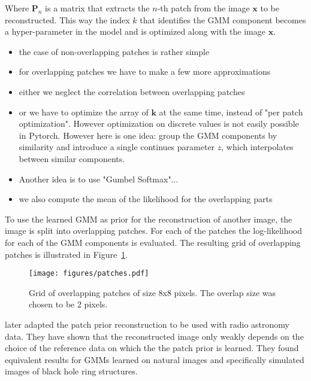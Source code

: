 \documentclass[twocolumn]{aastex631}
\begin{document}
    Where $\mathbf{P}_n$ is a matrix that extracts the $n$-th patch
    from the image $\mathbf{x}$ to be reconstructed. This way the index $k$ that identifies the GMM component becomes a hyper-parameter in the model and is optimized along with the image $\mathbf{x}$.
    
    \begin{itemize}
        \item the case of non-overlapping patches is rather simple
        \item for overlapping patches we have to make a few more approximations
        \item either we neglect the correlation between overlapping patches
        \item or we have to optimize the array of $\mathbf{k}$ at the same time, instead of "per patch optimization". However optimization on discrete 
        values is not easily possible in Pytorch. However here is one idea:
        group the GMM components by similarity and introduce a single continues
        parameter $z$, which interpolates between similar components.
        \item Another idea is to use "Gumbel Softmax"...
        \item we also compute the mean of the likelihood for the overlapping parts
    \end{itemize}

    To use the learned GMM as prior for the reconstruction of another image, the image is split into overlapping patches. For each of the patches the log-likelihood for each of the GMM components is evaluated. The resulting grid of overlapping patches is illustrated in Figure~\ref{fig:patches}.

    \begin{figure}
        \begin{centering}
            \texttt{[image: figures/patches.pdf]}
            \caption{
                Grid of overlapping patches of size 8x8 pixels. The overlap size was chosen to be 2 pixels.
            }
            \label{fig:patches}
        \end{centering}
    \end{figure}

    \cite{Bouman2016} later adapted the patch prior reconstruction to be used
    with radio astronomy data.
    They have shown that the reconstructed image only weakly depends on the choice
    of the reference data on which the the patch prior is learned. They found
    equivalent results for GMMs learned on natural images and specifically
    simulated images of black hole ring structures.
\end{document}
